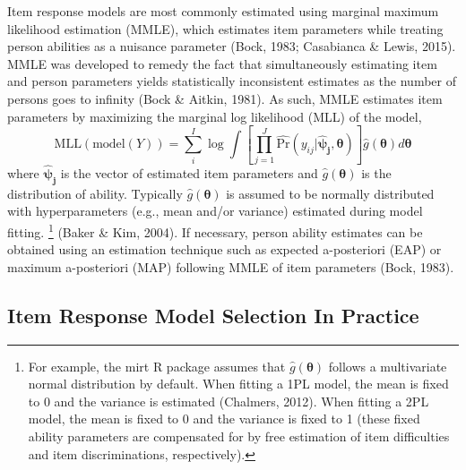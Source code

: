 \documentclass[
  english,
  man,floatsintext]{apa7}
\begin{document}
Item response models are most commonly estimated using marginal maximum likelihood estimation (MMLE), which estimates item parameters while treating person abilities as a nuisance parameter (Bock, 1983; Casabianca \& Lewis, 2015). MMLE was developed to remedy the fact that simultaneously estimating item and person parameters yields statistically inconsistent estimates as the number of persons goes to infinity (Bock \& Aitkin, 1981). As such, MMLE estimates item parameters by maximizing the marginal log likelihood (MLL) of the model,
\begin{equation}
\text{MLL}(\text{model}(Y))= \sum_{i}^{I} \log \int \left[\prod_{j=1}^{J} \hat{\text{Pr}}(y_{ij} | \bm{\hat\psi_j}, \bm{\theta}) \right] \hat g(\bm{\theta}) d\bm{\theta}
\end{equation}
where \(\bm{\hat\psi_j}\) is the vector of estimated item parameters and \(\hat g(\bm{\theta})\) is the distribution of ability. Typically \(\hat g(\bm{\theta})\) is assumed to be normally distributed with hyperparameters (e.g., mean and/or variance) estimated during model fitting. \footnote{For example, the mirt R package assumes that $\hat g(\bm{\theta})$ follows a multivariate normal distribution by default. When fitting a 1PL model, the mean is fixed to 0 and the variance is estimated (Chalmers, 2012). When fitting a 2PL model, the mean is fixed to 0 and the variance is fixed to 1 (these fixed ability parameters are compensated for by free estimation of item difficulties and item discriminations, respectively).} (Baker \& Kim, 2004). If necessary, person ability estimates can be obtained using an estimation technique such as expected a-posteriori (EAP) or maximum a-posteriori (MAP) following MMLE of item parameters (Bock, 1983).

\hypertarget{item-response-model-selection-in-practice}{%
\subsection{Item Response Model Selection In Practice}\label{item-response-model-selection-in-practice}}
\end{document}
